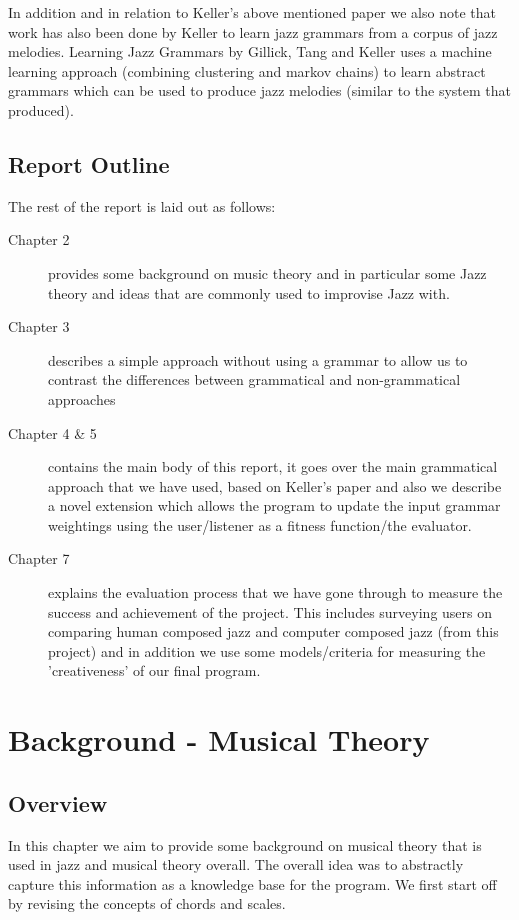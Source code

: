 \documentclass[pdftex,12pt,a4paper]{report}
\begin{document}
In addition and in relation to Keller's above mentioned paper \cite{keller07} we also note that work has also been done by Keller to learn jazz grammars from a corpus of jazz melodies. Learning Jazz Grammars by Gillick, Tang and Keller \cite{kellergillick09} uses a machine learning approach (combining clustering and markov chains) to learn abstract grammars which can be used to produce jazz melodies (similar to the system that \cite{keller07} produced). 


\section{Report Outline}
The rest of the report is laid out as follows:
\begin{description}
  \item[Chapter 2] provides some background on music theory and in particular some Jazz theory and ideas that are commonly used to improvise Jazz with.
  \item[Chapter 3] describes a simple approach without using a grammar to allow us to contrast the differences between grammatical and non-grammatical approaches
  \item[Chapter 4 \& 5] contains the main body of this report, it goes over the main grammatical approach that we have used, based on Keller's paper \cite{keller07} and also we describe a novel extension which allows the program to update the input grammar weightings using the user/listener as a fitness function/the evaluator.
  \item[Chapter 7] explains the evaluation process that we have gone through to measure the success and achievement of the project. This includes surveying users on comparing human composed jazz and computer composed jazz (from this project) and in addition we use some models/criteria for measuring the 'creativeness' of our final program.
\end{description}

\pagebreak

\chapter{Background - Musical Theory}

\section{Overview}
In this chapter we aim to provide some background on musical theory that is used in jazz and musical theory overall. The overall idea was to abstractly capture this information as a knowledge base for the program. We first start off by revising the concepts of chords and scales.
\end{document}
